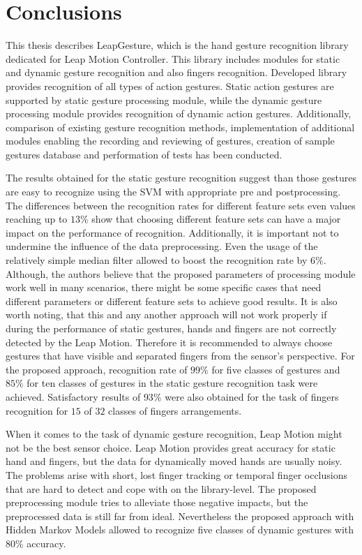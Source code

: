 \chapter{Conclusions}\label{conclusionsChapter}

This thesis describes LeapGesture, which is the hand gesture recognition library dedicated for Leap Motion Controller.
This library includes modules for static and dynamic gesture recognition and also fingers recognition.
Developed library provides recognition of all types of action gestures.
Static action gestures are supported by static gesture processing module, while the dynamic gesture processing module provides recognition of dynamic action gestures.
Additionally, comparison of existing gesture recognition methods, implementation of additional modules enabling the recording and reviewing of gestures, creation of sample gestures database and performation of tests has been conducted.

The results obtained for the static gesture recognition suggest than those gestures are easy to recognize using the SVM with appropriate pre and postprocessing.
The differences between the recognition rates for different feature sets even values reaching up to $13\%$ show that choosing different feature sets can have a major impact on the performance of recognition.
Additionally, it is important not to undermine the influence of the data preprocessing. 
Even the usage of the relatively simple median filter allowed to boost the recognition rate by $6\%$.
Although, the authors believe that the proposed parameters of processing module work well in many scenarios, there might be some specific cases that need different parameters or different feature sets to achieve good results.
It is also worth noting, that this and any another approach will not work properly if during the performance of static gestures, hands and fingers are not correctly detected by the Leap Motion.
Therefore it is recommended to always choose gestures that have visible and separated fingers from the sensor's perspective.
For the proposed approach, recognition rate of $99\%$ for five classes of gestures and $85\%$ for ten classes of gestures in the static gesture recognition task were achieved. Satisfactory results of $93\%$ were also obtained for the task of fingers recognition for $15$ of $32$ classes of fingers arrangements.

When it comes to the task of dynamic gesture recognition, Leap Motion might not be the best sensor choice.
Leap Motion provides great accuracy for static hand and fingers, but the data for dynamically moved hands are usually noisy.
The problems arise with short, lost finger tracking or temporal finger occlusions that are hard to detect and cope with on the library-level.
The proposed preprocessing module tries to alleviate those negative impacts, but the preprocessed data is still far from ideal.
Nevertheless the proposed approach with Hidden Markov Models allowed to recognize five classes of dynamic gestures with $80\%$ accuracy.

